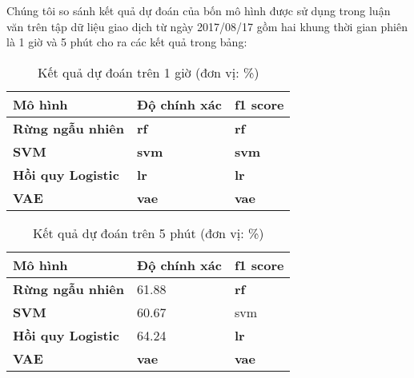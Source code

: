 Chúng tôi so sánh kết quả dự đoán của bốn mô hình được sử dụng trong luận văn trên tập dữ liệu giao dịch từ ngày 2017/08/17 gồm hai khung thời gian phiên là 1 giờ và 5 phút cho ra các kết quả trong bảng:
\begin{table}[H] 
    \centering

    \begin{tabularx}{0.8\textwidth}
    {
    p{}%
    p{}%
    p{}
    }
        
        \toprule
        \textbf{Mô hình} & \textbf{Độ chính xác} & \textbf{f1 score} \\
        \midrule
        \textbf{Rừng ngẫu nhiên} & \textbf{rf} & \textbf{rf} \\
        \textbf{SVM} & \textbf{svm} & \textbf{svm} \\
        \textbf{Hồi quy Logistic} & \textbf{lr} & \textbf{lr} \\
        \textbf{VAE} & \textbf{vae} & \textbf{vae} \\
        \bottomrule
        
    \end{tabularx}
    \label{tab:1h_compare}
    \caption{Kết quả dự đoán trên 1 giờ (đơn vị: \%)}
\end{table}



\begin{table}[H] 
    \centering

    \begin{tabularx}{0.8\textwidth}
    {
    p{}%
    p{}%
    p{}
    }
        
        \toprule
        \textbf{Mô hình} & \textbf{Độ chính xác} & \textbf{f1 score} \\
        \midrule
        \textbf{Rừng ngẫu nhiên} & 61.88 & \textbf{rf} \\
        \textbf{SVM} & 60.67 & svm \\
        \textbf{Hồi quy Logistic} & 64.24 & \textbf{lr} \\
        \textbf{VAE} & \textbf{vae} & \textbf{vae} \\
        \bottomrule
        
    \end{tabularx}
    \label{tab:1h_compare}
    \caption{Kết quả dự đoán trên 5 phút (đơn vị: \%)}
\end{table}




